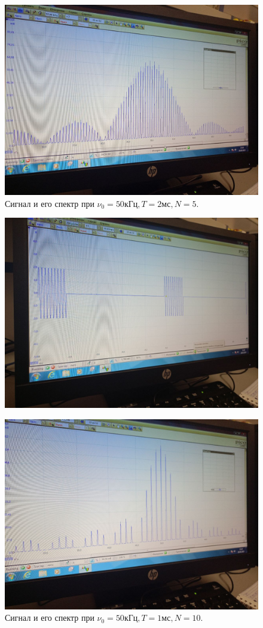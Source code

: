 \documentclass[a4paper,12pt]{article}
\begin{document}
\begin{figure}[H]
    \includegraphics[width=.9\textwidth]{B.13.3.spectr}
    \caption{Сигнал и его спектр при $\nu_{0} = 50 \text{кГц}, T = 2 \text{мс}, N = 5.$}\label{fig:foobar}
\end{figure}

\begin{figure}[H]
\begin{center}
    \includegraphics[width=.6\textwidth]{B.13.4.graph}
\end{center}
\end{figure}

\begin{figure}[H]
    \includegraphics[width=.9\textwidth]{B.13.4.spectr}
    \caption{Сигнал и его спектр при $\nu_{0} = 50 \text{кГц}, T = 1 \text{мс}, N = 10.$}\label{fig:foobar}
\end{figure}
\end{document}
